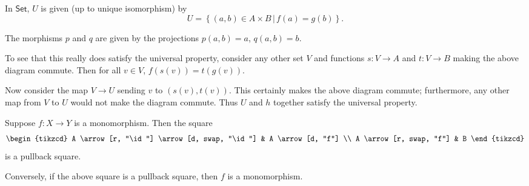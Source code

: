 \documentclass[main.tex]{subfiles}
\begin{document}
\begin{example}
  In $\mathsf{Set}$, $U$ is given (up to unique isomorphism) by
  \begin{equation*}
    U = \left\{ (a,b) \in A \times B \,\big|\, f(a) = g(b) \right\}.
  \end{equation*}

  The morphisms $p$ and $q$ are given by the projections $p(a,b) = a$, $q(a,b) = b$.

  To see that this really does satisfy the universal property, consider any other set $V$ and functions $s\colon V \to A$ and $t\colon V \to B$ making the above diagram commute. Then for all $v \in V$, $f(s(v)) = t(g(v))$.

  Now consider the map $V \to U$ sending $v$ to $(s(v), t(v))$. This certainly makes the above diagram commute; furthermore, any other map from $V$ to $U$ would not make the diagram commute. Thus $U$ and $h$ together satisfy the universal property.
\end{example}

\begin{example}
  Suppose $f\colon X \to Y$ is a monomorphism. Then the square
  \begin{equation*}
    \begin{tikzcd}
      A
      \arrow[r, "\id"]
      \arrow[d, swap, "\id"]
      & A
      \arrow[d, "f"]
      \\
      A
      \arrow[r, swap, "f"]
      & B
    \end{tikzcd}
  \end{equation*}
  is a pullback square.

  Conversely, if the above square is a pullback square, then $f$ is a monomorphism.
\end{example}
\end{document}
